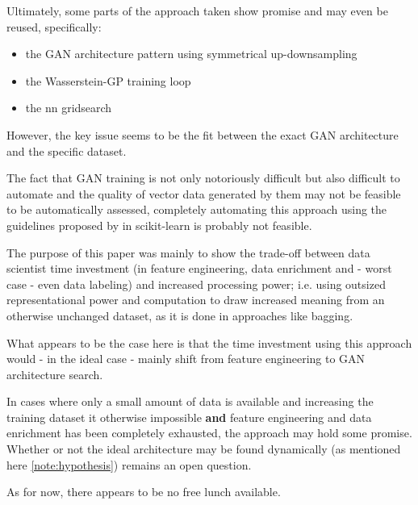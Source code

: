 Ultimately, some parts of the approach taken show promise and may even be reused, specifically:

\begin{itemize}
	\item the \ac{GAN} architecture pattern using symmetrical up-downsampling
	\item the Wasserstein-GP training loop
	\item the \ac{nn} gridsearch
\end{itemize}

However, the key issue seems to be the fit between the exact \ac{GAN} architecture and the specific dataset.

The fact that \ac{GAN} training is not only notoriously difficult but also difficult to automate and the quality of vector data generated by them may not be feasible to be automatically assessed, completely automating this approach using the guidelines proposed by \cite{buitinck2013api} in scikit-learn is probably not feasible.

The purpose of this paper was mainly to show the trade-off between data scientist time investment (in feature engineering, data enrichment and - worst case - even data labeling) and increased processing power; i.e. using outsized representational power and computation to draw increased meaning from an otherwise unchanged dataset, as it is done in approaches like \ac{bagging}.

What appears to be the case here is that the time investment using this approach would - in the ideal case - mainly shift from feature engineering to \ac{GAN} architecture search.

In cases where only a small amount of data is available and increasing the training dataset it otherwise impossible \textbf{and} feature engineering and data enrichment has been completely exhausted, the approach may hold some promise. Whether or not the ideal architecture may be found dynamically (as mentioned here \ref{note:hypothesis}) remains an open question.

As for now, there appears to be no free lunch available.

\pagebreak
